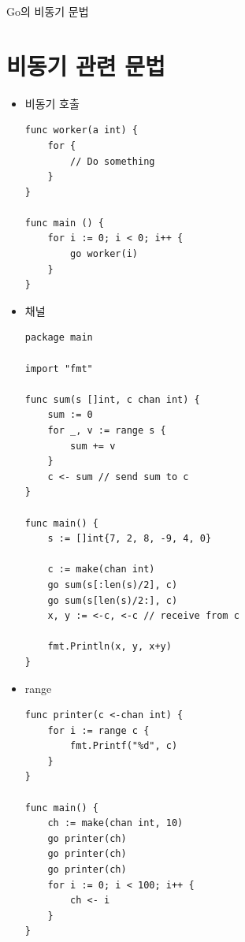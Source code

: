 \documentclass{beamer}
\begin{document}
 \begin{frame}{Go의 비동기 문법}
 \section{비동기 관련 문법}
  \begin{itemize}
   \item 비동기 호출
\begin{lstlisting}
func worker(a int) {
    for {
        // Do something
    }
}

func main () {
    for i := 0; i < 0; i++ {
        go worker(i)
    }
}
\end{lstlisting}
    \framebreak

    \item 채널
    \begin{lstlisting}[basicstyle=\tiny]
package main

import "fmt"

func sum(s []int, c chan int) {
	sum := 0
	for _, v := range s {
		sum += v
	}
	c <- sum // send sum to c
}

func main() {
	s := []int{7, 2, 8, -9, 4, 0}

	c := make(chan int)
	go sum(s[:len(s)/2], c)
	go sum(s[len(s)/2:], c)
	x, y := <-c, <-c // receive from c

	fmt.Println(x, y, x+y)
}
    \end{lstlisting}

    \framebreak

    \item range
    \begin{lstlisting}
func printer(c <-chan int) {
    for i := range c {
        fmt.Printf("%d", c)
    }
}

func main() {
    ch := make(chan int, 10)
    go printer(ch)
    go printer(ch)
    go printer(ch)
    for i := 0; i < 100; i++ {
        ch <- i
    }
}
    \end{lstlisting}


  \end{itemize}

 \end{frame}
\end{document}
